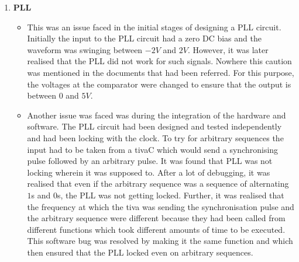 \documentclass{article}
\begin{document}
\begin{enumerate}
\begin{itemize}
  \end{itemize}
\item \textbf{PLL}
  \begin{itemize}
  \item This was an issue faced in the initial stages of designing a PLL circuit. Initially the input to the PLL circuit had a zero DC bias and the waveform was swinging between $-2 V$ and $ 2 V$. However, it was later realised that the PLL did not work for such signals. Nowhere this caution was mentioned in the documents that had been referred. For this purpose, the voltages at the comparator were changed to ensure that the output is between $0$ and $5 V$.
  \item Another issue was faced was during the integration of the hardware and software. The PLL circuit had been designed and tested independently and had been locking with the clock. To try for arbitrary sequences the input had to be taken from a tivaC which would send a synchronising pulse followed by an arbitrary pulse. It was found that PLL was not locking wherein it was supposed to. After a lot of debugging, it was realised that even if the arbitrary sequence was a sequence of alternating $1$s and $0$s, the PLL was not getting locked. Further, it was realised that the frequency at which the tiva was sending the synchronisation pulse and the arbitrary sequence were different because they had been called from different functions which took different amounts of time to be executed. This software bug was resolved by making it the same function and which then ensured that the PLL locked even on arbitrary sequences.
  \end{itemize}
\end{enumerate}
\end{document}
